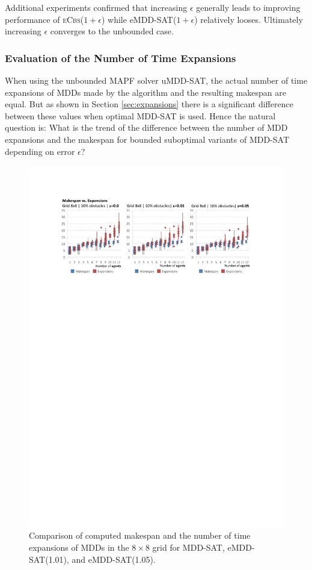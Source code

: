 \documentclass[jair,oneside,11pt]{article}
\begin{document}
Additional experiments confirmed that increasing $\epsilon$ generally leads to improving performance of \textsc{eCbs}($1 + \epsilon$) while eMDD-SAT($1 + \epsilon$) relatively looses. Ultimately increasing $\epsilon$ converges to the unbounded case.

\subsubsection{Evaluation of the Number of Time Expansions}
When using the unbounded MAPF solver uMDD-SAT, the actual number of time expansions of MDDs made by the algorithm and the resulting makespan are equal. But as shown in Section \ref{sec:expansions} there is a significant difference between these values when optimal MDD-SAT is used. Hence the natural question is: What is the trend of the difference between the number of MDD expansions and the makespan for bounded suboptimal variants of MDD-SAT depending on error $\epsilon$?

\begin{figure}[h]
\centering
\includegraphics[trim={2.5cm 20.8cm 2.5cm 2.7cm},clip,width=1.0\textwidth]{expr_grids-make-expand_8x8.pdf}
\vspace{-0.6cm}\caption{Comparison of computed makespan and the number of time expansions of MDDs in the $8{}\times{}8$ grid for MDD-SAT, eMDD-SAT(1.01), and eMDD-SAT(1.05).}
\label{figure-make-expand-grids_8x8}
\end{figure}
\end{document}

